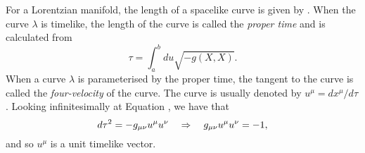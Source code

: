 For a Lorentzian manifold, the length of a spacelike curve is given by . When the curve $\lambda$ is timelike, the length of the curve is called the \emph{proper time} and is calculated from
\begin{equation}
\label{eq:lorlen}	
  \tau = \int^b_a  du \sqrt{- g(X,X)} .
\end{equation}
When a curve $\lambda$ is parameterised by the proper time, the tangent to the curve is called the \emph{four-velocity} of the curve. The curve is usually denoted by $u^\mu = dx^\mu / d\tau$. Looking infinitesimally at Equation , we have that
\begin{equation*}
	d\tau^2 = - {g_{\mu\nu}} u^\mu u^\nu \quad \Rightarrow \quad  {g_{\mu\nu}} u^\mu u^\nu = -1,
\end{equation*} 
and so $u^\mu$ is a unit timelike vector.

